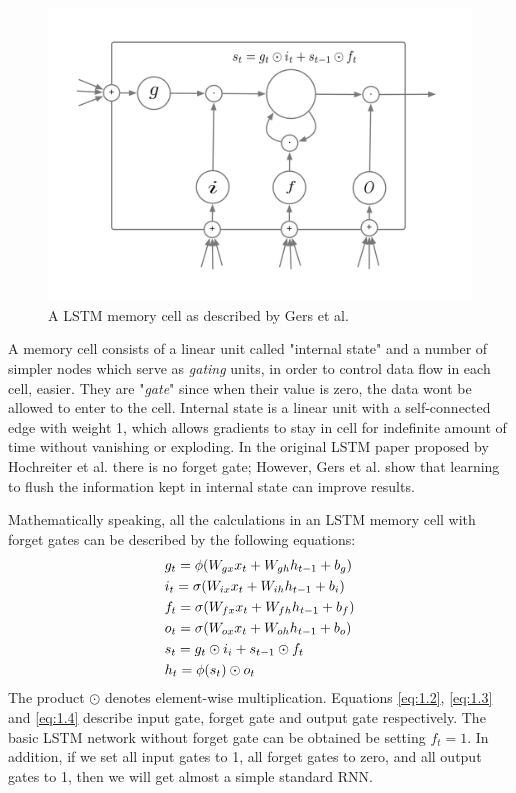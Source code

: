 \documentclass{sfuthesis}
\begin{document}
\begin{figure}[t]
\centering
\includegraphics[scale=0.15]{./images/LSTM}
\caption[LSTM memory cell]{A LSTM memory cell as described by Gers et al. \cite{Gers:2000:LFC}}
\label{fig:LSTM0}
\end{figure}

A memory cell consists of a linear unit called "internal state" and a number of simpler nodes which serve as \textit{gating} units, in order to control data flow in each cell, easier. They are "\textit{gate}" since when their value is zero, the data wont be allowed to enter to the cell. Internal state is a linear unit with a self-connected edge with weight 1, which allows gradients to stay in cell for indefinite amount of time without vanishing or exploding. In the original LSTM paper proposed by Hochreiter et al. \cite{Hochreiter:1997:LSM} there is no forget gate; However, Gers et al. \cite{Gers:2000:LFC} show that learning to flush the information kept in internal state can improve results.

Mathematically speaking, all the calculations in an LSTM memory cell with forget gates can be described by the following equations:
\begin{align}
\centering
&g_t = \phi (W_{gx}x_t + W_{gh}h_{t-1} + b_g) \label{eq:1.1}\\
&i_t = \sigma (W_{ix}x_t + W_{ih}h_{t-1} + b_i) \label{eq:1.2}\\
&f_t = \sigma (W_{fx}x_t + W_{fh}h_{t-1} + b_f) \label{eq:1.3}\\
&o_t = \sigma (W_{ox}x_t + W_{oh}h_{t-1} + b_o) \label{eq:1.4}\\ 
&s_t = g_t \odot i_i + s_{t-1} \odot f_t \label{eq:1.5}\\
&h_t = \phi(s_t) \odot o_t
\end{align}
The product $\odot$ denotes element-wise multiplication. Equations \ref{eq:1.2}, \ref{eq:1.3} and \ref{eq:1.4} describe input gate, forget gate and output gate respectively. The basic LSTM network without forget gate can be obtained be setting $f_t = 1$. In addition, if we set all input gates to 1, all forget gates to zero, and all output gates to 1, then we will get almost a simple standard RNN. 
\end{document}
